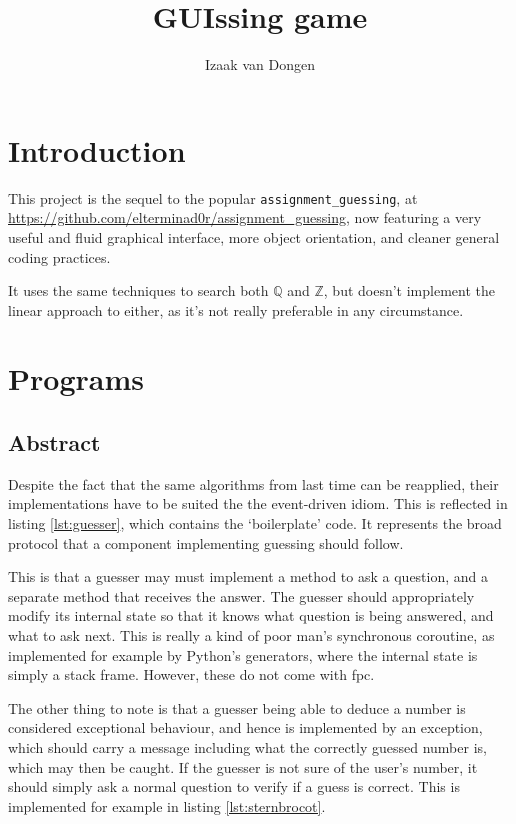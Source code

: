 \documentclass[a4paper,11pt]{article}
\title{GUIssing game}
\author{Izaak van Dongen}
\begin{document}
    \maketitle\thispagestyle{empty} %
    \tableofcontents
    \listoflistings

    \section{Introduction}

    This project is the sequel to the popular \texttt{assignment\_guessing},
    at \url{https://github.com/elterminad0r/assignment_guessing}, now featuring
    a very useful and fluid graphical interface, more object orientation, and
    cleaner general coding practices.

    It uses the same techniques to search both $\mathbb{Q}$ and $\mathbb{Z}$,
    but doesn't implement the linear approach to either, as it's not really
    preferable in any circumstance.

    \section{Programs}

    \subsection{Abstract}

    Despite the fact that the same algorithms from last time can be reapplied,
    their implementations have to be suited the the event-driven idiom. This is
    reflected in listing \ref{lst:guesser}, which contains the `boilerplate'
    code. It represents the broad protocol that a component implementing
    guessing should follow.

    This is that a guesser may must implement a method to ask a question, and a
    separate method that receives the answer. The guesser should appropriately
    modify its internal state so that it knows what question is being answered,
    and what to ask next. This is really a kind of poor man's synchronous
    coroutine, as implemented for example by Python's generators, where the
    internal state is simply a stack frame. However, these do not come with fpc.

    The other thing to note is that a guesser being able to deduce a number is
    considered exceptional behaviour, and hence is implemented by an exception,
    which should carry a message including what the correctly guessed number is,
    which may then be caught. If the guesser is not sure of the user's number,
    it should simply ask a normal question to verify if a guess is correct. This
    is implemented for example in listing \ref{lst:sternbrocot}.
\end{document}
